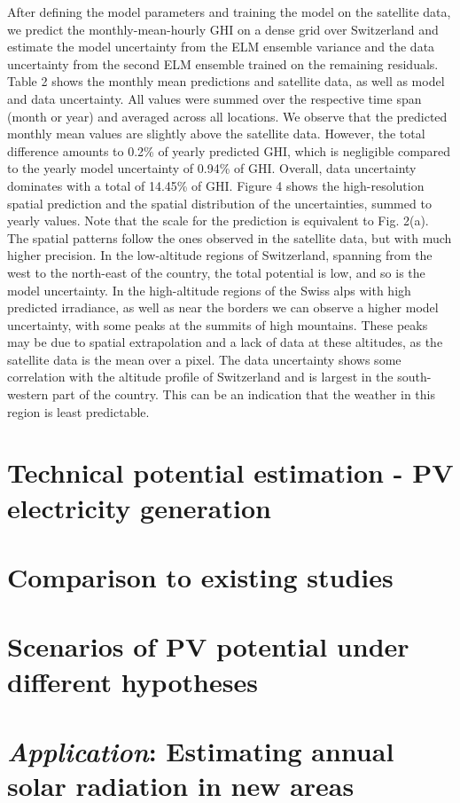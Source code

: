 After defining the model parameters and training the model on the satellite data, we predict the monthly-mean-hourly GHI on a dense grid over Switzerland and estimate the model uncertainty from the ELM ensemble variance and the data uncertainty from the second ELM ensemble trained on the remaining residuals. Table 2 shows the monthly mean predictions and satellite data, as well as model and data uncertainty. All values were summed over the respective time span (month or year) and averaged across all locations. We observe that the predicted monthly mean values are slightly above the satellite data. However, the total difference amounts to 0.2\% of yearly predicted GHI, which is negligible compared to the yearly model uncertainty of 0.94\% of GHI. Overall, data uncertainty dominates with a total of 14.45\% of GHI. Figure 4 shows the high-resolution spatial prediction and the spatial distribution of the uncertainties, summed to yearly values. Note that the scale for the prediction is equivalent to Fig. 2(a). The spatial patterns follow the ones observed in the satellite data, but with much higher precision. In the low-altitude regions of Switzerland, spanning from the west to the north-east of the country, the total potential is low, and so is the model uncertainty. In the high-altitude regions of the Swiss alps with high predicted irradiance, as well as near the borders we can observe a higher model uncertainty, with some peaks at the summits of high mountains. These peaks may be due to spatial extrapolation and a lack of data at these altitudes, as the satellite data is the mean over a pixel. The data uncertainty shows some correlation with the altitude profile of Switzerland and is largest in the south-western part of the country. This can be an indication that the weather in this region is least predictable.


\section{Technical potential estimation - PV electricity generation}
\label{solar_tech}

\section{Comparison to existing studies}
\label{solar_comparison}

\section{Scenarios of PV potential under different hypotheses}


\section{\textit{Application}: Estimating annual solar radiation in new areas}
\label{solar_application}

